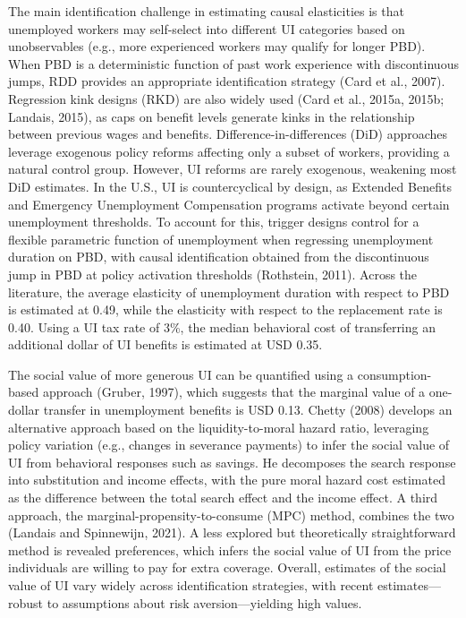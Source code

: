 \documentclass{article}
\begin{document}
The main identification challenge in estimating causal elasticities is that unemployed workers may self-select into different UI categories based on unobservables (e.g., more experienced workers may qualify for longer PBD). When PBD is a deterministic function of past work experience with discontinuous jumps, RDD provides an appropriate identification strategy (Card et al., 2007). Regression kink designs (RKD) are also widely used (Card et al., 2015a, 2015b; Landais, 2015), as caps on benefit levels generate kinks in the relationship between previous wages and benefits. Difference-in-differences (DiD) approaches leverage exogenous policy reforms affecting only a subset of workers, providing a natural control group. However, UI reforms are rarely exogenous, weakening most DiD estimates. In the U.S., UI is countercyclical by design, as Extended Benefits and Emergency Unemployment Compensation programs activate beyond certain unemployment thresholds. To account for this, trigger designs control for a flexible parametric function of unemployment when regressing unemployment duration on PBD, with causal identification obtained from the discontinuous jump in PBD at policy activation thresholds (Rothstein, 2011). Across the literature, the average elasticity of unemployment duration with respect to PBD is estimated at 0.49, while the elasticity with respect to the replacement rate is 0.40. Using a UI tax rate of 3\%, the median behavioral cost of transferring an additional dollar of UI benefits is estimated at USD 0.35.

The social value of more generous UI can be quantified using a consumption-based approach (Gruber, 1997), which suggests that the marginal value of a one-dollar transfer in unemployment benefits is USD 0.13. Chetty (2008) develops an alternative approach based on the liquidity-to-moral hazard ratio, leveraging policy variation (e.g., changes in severance payments) to infer the social value of UI from behavioral responses such as savings. He decomposes the search response into substitution and income effects, with the pure moral hazard cost estimated as the difference between the total search effect and the income effect. A third approach, the marginal-propensity-to-consume (MPC) method, combines the two (Landais and Spinnewijn, 2021). A less explored but theoretically straightforward method is revealed preferences, which infers the social value of UI from the price individuals are willing to pay for extra coverage. Overall, estimates of the social value of UI vary widely across identification strategies, with recent estimates—robust to assumptions about risk aversion—yielding high values.
\end{document}

